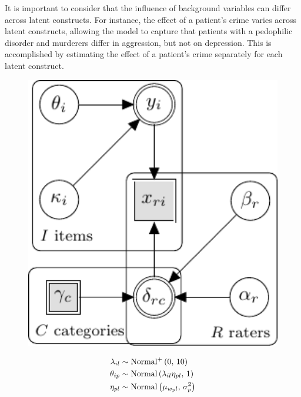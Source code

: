 \documentclass[a4paper,usenames,dvipsnames]{article}
\begin{document}
It is important to consider that the influence of background variables can differ across latent constructs. For instance, the effect of a patient's crime varies across latent constructs, allowing the model to capture that patients with a pedophilic disorder and murderers differ in aggression, but not on depression. This is accomplished by estimating the effect of a patient's crime separately for each latent construct.

\begin{figure}[!ht]
	\begin{minipage}{0.6\textwidth}
		\centering
		\includegraphics[width=1\textwidth, page=10]{graphicalModels/graphicalModels.pdf}
	\end{minipage}\hfill
\begin{minipage}{0.4\textwidth}
{\large
	\begin{align*}
	\FactorRegression_{\Iitem\Ilatent}		&\sim 	\dnormp{0}{10}																	\\
	\ItemTruth_{\Iitem\Ipatient} 			&\sim 	\dnorm{\lambda_{\Iitem\Ilatent}\eta_{\Ipatient\Ilatent}}{1}						\\
	\FactorScore_{\Ipatient\Ilatent} 		&\sim 	\dnorm{\mu_{\PatientCovariate_{\Ipatient}\Ilatent}}{\sigma_{\Ipatient}^2}		\\

\end{align*}}
\end{minipage}
\end{figure}
\end{document}
